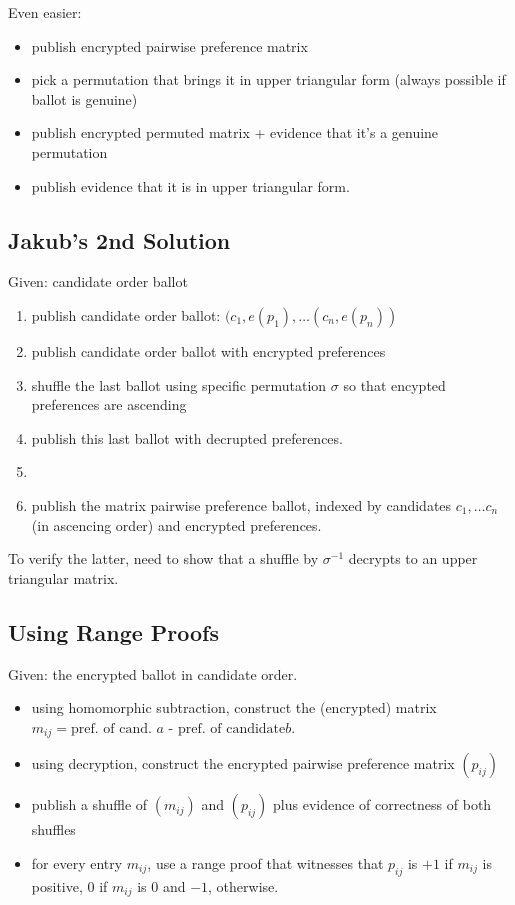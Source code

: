 \documentclass{llncs}
\begin{document}
Even easier:
\begin{itemize}
\item publish encrypted pairwise preference matrix
\item pick a permutation that brings it in upper triangular form
(always possible if ballot is genuine)
\item publish encrypted permuted matrix + evidence that it's a
genuine permutation
\item publish evidence that it is in upper triangular form.
\end{itemize}

\subsection{Jakub's 2nd Solution}

Given: candidate order ballot
\begin{enumerate}
\item publish candidate order ballot: $(c_1, e(p_1), \dots (c_n,
e(p_n))$
\item publish candidate order ballot with encrypted preferences
\item shuffle the last ballot using specific permutation $\sigma$ so that encypted preferences are
ascending
\item publish this last ballot with decrupted preferences.
\item []
\item publish the matrix pairwise preference ballot, indexed by
  candidates $c_1, \dots c_n$ (in ascencing order) and encrypted
  preferences.
\end{enumerate}

To verify the latter, need to show that a shuffle by $\sigma^{-1}$
decrypts to an upper triangular matrix.

\subsection{Using Range Proofs}

Given: the encrypted ballot in candidate order.

\begin{itemize}
\item using homomorphic subtraction, construct the (encrypted)
matrix $m_{ij} = \mbox{pref. of cand. $a$ - pref. of candidate
$b$}$.
\item using decryption, construct the encrypted pairwise preference
matrix $(p_{ij})$
\item publish a shuffle of $(m_{ij})$ and $(p_{ij})$ plus evidence of correctness
of both shuffles
\item for every entry $m_{ij}$, use a range proof that witnesses
that $p_{ij}$ is $+1$ if $m_{ij}$ is positive, $0$ if $m_{ij}$ is
$0$ and $-1$, otherwise.
\end{itemize}
\end{document}
